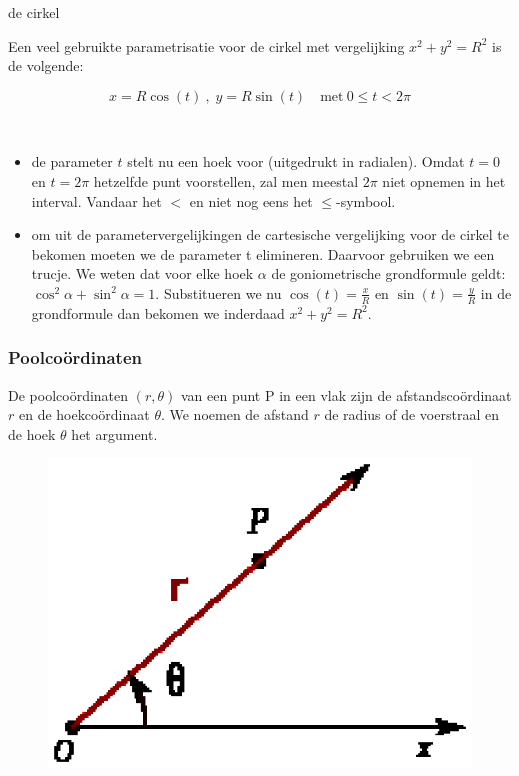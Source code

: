 \begin{voorbeeld}
	de cirkel

Een veel gebruikte parametrisatie voor de cirkel met vergelijking
$x^{2}+y^{2}=R^{2}$ is de volgende:

\begin{equation*}
x=R\cos(t)\:,\;y=R\sin(t)\quad\textrm{met}\:0\leq t<2\pi
\end{equation*}

\begin{opmerking}
	\ \\
	\begin{itemize}
\item de parameter $t$ stelt nu een hoek voor (uitgedrukt in radialen).
Omdat $t=0$ en $t=2\pi$ hetzelfde punt voorstellen, zal men meestal
$2\pi$ niet opnemen in het interval. Vandaar het $<$ en niet nog
eens het $\leq$-symbool.
\item om uit de parametervergelijkingen de cartesische vergelijking voor
de cirkel te bekomen moeten we de parameter t elimineren. Daarvoor
gebruiken we een trucje. We weten dat voor elke hoek $\alpha$ de
goniometrische grondformule geldt: $\cos^{2}\alpha+\sin^{2}\alpha=1$.
Substitueren we nu $\cos(t)=\frac{x}{R}$ en $\sin(t)=\frac{y}{R}$
in de grondformule dan bekomen we inderdaad $x^{2}+y^{2}=R^{2}$.
\end{itemize}

\end{opmerking}
\end{voorbeeld}


\subsubsection{Poolco\"ordinaten}

De poolco\"ordinaten $\left(r,\theta\right)$ van een punt P in een
vlak zijn de afstandsco\"ordinaat $r$ en de hoekco\"ordinaat $\theta$.
We noemen de afstand $r$ de radius of de voerstraal en de hoek $\theta$
het argument.

\begin{figure}
\centering
\includegraphics{2_elem_rekenvaardigheden_B/inputs/Poolcoordinaten_wikipedia}
\end{figure}

